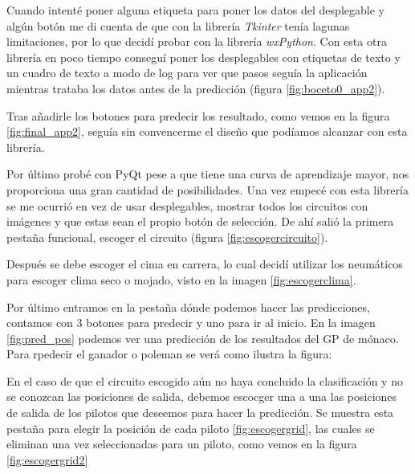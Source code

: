 Cuando intenté poner alguna etiqueta para poner los datos del desplegable y algún botón me di cuenta de que con la librería \textit{Tkinter} tenía lagunas limitaciones, por lo que decidí probar con la librería \textit{wxPython}. Con esta otra librería en poco tiempo conseguí poner los desplegables con etiquetas de texto y un cuadro de texto a modo de log para ver que pasos seguía la aplicación mientras trataba los datos antes de la predicción (figura \ref{fig:boceto0_app2}).


Tras añadirle los botones para predecir los resultado, como vemos en la figura \ref{fig:final_app2}, seguía sin convencerme el diseño que podíamos alcanzar con esta librería.


Por último probé con PyQt pese a que tiene una curva de aprendizaje mayor, nos proporciona una gran cantidad de posibilidades. Una vez empecé con esta librería se me ocurrió en vez de usar desplegables, mostrar todos los circuitos con imágenes y que estas sean el propio botón de selección. De ahí salió la primera pestaña funcional, escoger el circuito (figura \ref{fig:escogercircuito}).


Después se debe escoger el cima en carrera, lo cual decidí utilizar los neumáticos para escoger clima seco o mojado, visto en la imagen \ref{fig:escogerclima}.


Por último entramos en la pestaña dónde podemos hacer las predicciones, contamos con 3 botones para predecir y uno para ir al inicio. En la imagen \ref{fig:pred_pos} podemos ver una predicción de los resultados del GP de mónaco. Para rpedecir el ganador o poleman se verá como ilustra la figura: 



En el caso de que el circuito escogido aún no haya concluido la clasificación y no se conozcan las posiciones de salida, debemos escocger una a una las posiciones de salida de los pilotos que deseemos para hacer la predicción. Se muestra esta pestaña para elegir la posición de cada piloto \ref{fig:escogergrid}, las cuales se eliminan una vez seleccionadas para un piloto, como vemos en la figura \ref{fig:escogergrid2}

